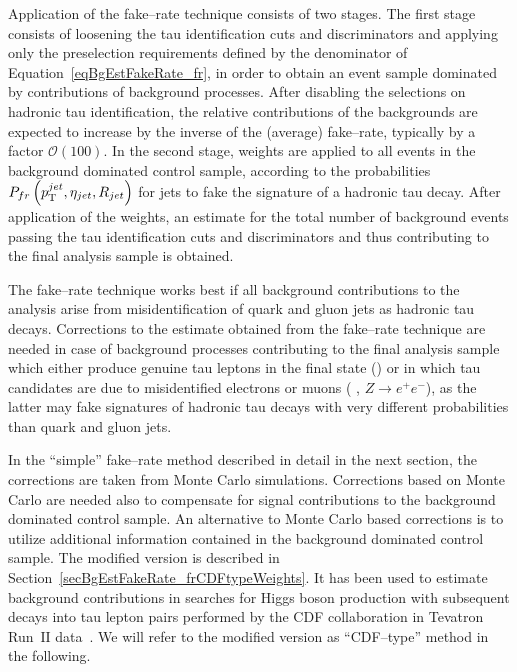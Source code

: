 Application of the fake--rate technique consists of two stages.  The first stage
consists of loosening the tau identification cuts and discriminators and
applying only the preselection requirements defined by the denominator of
Equation~\ref{eqBgEstFakeRate_fr}, in order to obtain an event sample dominated
by contributions of background processes. After disabling the selections on
hadronic tau identification, the relative contributions of the backgrounds are
expected to increase by the inverse of the (average) fake--rate, typically by a
factor $\mathcal{O} \left( 100 \right)$.  In the second stage, weights are
applied to all events in the background dominated control sample, according to
the probabilities $P_{fr} \left( p_{\mathrm{T}}^{jet}, \eta_{jet}, R_{jet} \right)$ for
jets to fake the signature of a hadronic tau decay.  After application of the
weights, an estimate for the total number of background events passing the tau
identification cuts and discriminators and thus contributing to the final
analysis sample is obtained.

The fake--rate technique works best if all background contributions to the
analysis arise from misidentification of quark and gluon jets as hadronic tau
decays.  Corrections to the estimate obtained from the fake--rate technique  are
needed in case of background processes contributing to the final analysis sample
which either produce genuine tau leptons in the final state (\eg \ttbarpJets) or
in which tau candidates are due to misidentified electrons or muons (\eg
\ZMM, $Z \to e^{+} e^{-}$), as the latter may fake signatures of hadronic tau
decays with very different probabilities than quark and gluon jets. 

In the ``simple'' fake--rate method described in detail in the next
section, the corrections are taken from Monte Carlo simulations.  Corrections
based on Monte Carlo are needed also to compensate for signal contributions to
the background dominated control sample.
An alternative to Monte Carlo based corrections is to utilize additional
information contained in the background dominated control sample.  The modified
version is described in Section~\ref{secBgEstFakeRate_frCDFtypeWeights}.  It has
been used to estimate background contributions in searches for Higgs boson
production with subsequent decays into tau lepton pairs performed by the CDF
collaboration in Tevatron Run~$\mathrm{II}$ data~\cite{CDFMSSMHiggs,
CDFFakerateDJang, CDFrefPzeta}.  We will
refer to the modified version as ``CDF--type'' method in the following.

